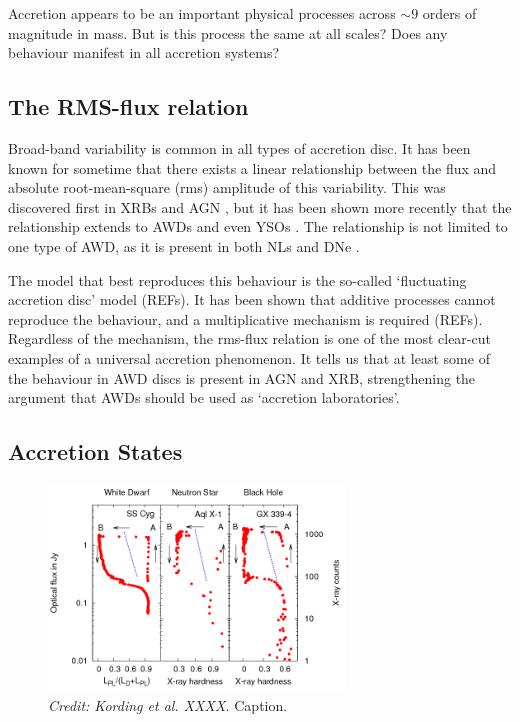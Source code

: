Accretion appears to be an important physical processes across $\sim9$ orders
of magnitude in mass. But is this process the same at all scales? Does any 
behaviour manifest in all accretion systems? 

\subsection{The RMS-flux relation}

Broad-band variability is common in all types of accretion disc. It has been
known for sometime that there exists a linear relationship
between the flux and absolute root-mean-square (rms) amplitude
of this variability. This was discovered first in XRBs and AGN 
\citep{uttley2001, uttley2005, heil2012}, but it has been shown
more recently that the relationship extends to AWDs and even YSOs 
\citep{scaringi2012,scaringi2015a}. The relationship is not limited
to one type of AWD, as it is present in both NLs and DNe \citep{vandesande2015}.
 
The model that best reproduces this behaviour is the so-called
`fluctuating accretion disc' model (REFs). It has been shown that 
additive processes cannot reproduce the behaviour, and a multiplicative
mechanism is required (REFs). 
Regardless of the mechanism, the rms-flux relation is one of the most
clear-cut examples of a universal accretion phenomenon. 
It tells us that at least some of the behaviour in AWD discs
is present in AGN and XRB, strengthening the argument that AWDs
should be used as `accretion laboratories'. 


\subsection{Accretion States}


\begin{figure}
\centering
\includegraphics[width=0.7\textwidth]{figures/02-accretion/kording_hid.png}
\caption
{
{\sl Credit: Kording et al. XXXX.} 
Caption.
} 
\label{fig:kording_hid}
\end{figure}



